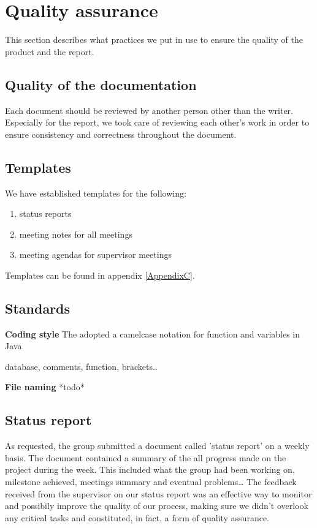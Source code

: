 




\section{Quality assurance}
\label{section:qa}

This section describes what practices we put in use to ensure the quality of the product and the report.

\subsection{Quality of the documentation}
Each document should be reviewed by another person other than the writer.
Especially for the report, we took care of reviewing each other's work in order to ensure
consistency and correctness throughout the document.

\subsection{Templates}
We have established templates for the following:
\begin{enumerate}
\item status reports
\item meeting notes for all meetings
\item meeting agendas for supervisor meetings
\end{enumerate}

Templates can be found in appendix \ref{AppendixC}.

\subsection{Standards}

\textbf{Coding style}
The adopted a camelcase notation  for function and variables in Java

database, comments, function, brackets..

\textbf{File naming}
*todo*

\subsection{Status report}
As requested, the group submitted a document called 'status report' on a weekly basis.
The document contained a summary of the all progress made on the project during the week.
This included what the group had been working on, milestone achieved, meetings summary and eventual problems\ldots
The feedback received from the supervisor on our status report was an effective way to monitor and possibily improve
the quality of our process, making sure we didn't overlook any critical tasks and constituted, in fact, a form of
quality assurance.

